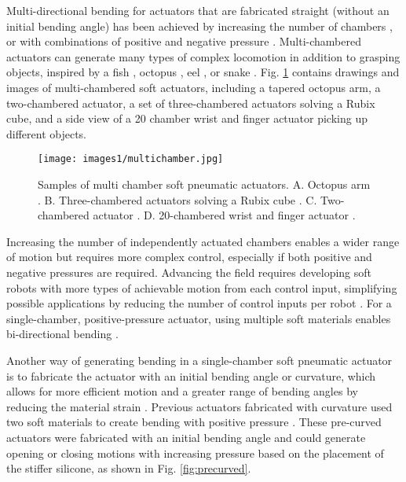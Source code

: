 Multi-directional bending for actuators that are fabricated straight (without an initial bending angle) has been achieved by increasing the number of chambers \cite{bilodeau_design_2018, cappello_exploiting_2018, fei_novel_2019, pang_novel_2019, pagoli_soft_2021}, or with combinations of positive and negative pressure \cite{wakimoto_miniature_2011, ariyanto_three-fingered_2019, fatahillah_novel_2020, terrile_comparison_2021}. Multi-chambered actuators can generate many types of complex locomotion in addition to grasping objects, inspired by a fish \cite{feng_body_2020, zhou_modeling_2020}, octopus \cite{fras_bio-inspired_2018, xie_octopus_2020}, eel \cite{nguyen_anguilliform_2022}, or snake \cite{arachchige_wheelless_2023}. Fig. \ref{fig:multichamber} contains drawings and images of multi-chambered soft actuators, including a tapered octopus arm, a two-chambered actuator, a set of three-chambered actuators solving a Rubix cube, and a side view of a 20 chamber wrist and finger actuator picking up different objects. \\

\begin{figure}[!ht]
    \centering
    \texttt{[image: images1/multichamber.jpg]}
    \caption{Samples of multi chamber soft pneumatic actuators. A. Octopus arm \cite{xie_octopus_2020}. B. Three-chambered actuators solving a Rubix cube \cite{pagoli_soft_2021}. C. Two-chambered actuator \cite{bilodeau_design_2018}. D. 20-chambered wrist and finger actuator \cite{fei_novel_2019}.}
    \label{fig:multichamber}
\end{figure}

Increasing the number of independently actuated chambers enables a wider range of motion but requires more complex control, especially if both positive and negative pressures are required. Advancing the field requires developing soft robots with more types of achievable motion from each control input, simplifying possible applications by reducing the number of control inputs per robot \cite{gorissen_elastic_2017}. For a single-chamber, positive-pressure actuator, using multiple soft materials enables bi-directional bending \cite{ellis_generative_2022}. 

\clearpage
Another way of generating bending in a single-chamber soft pneumatic actuator is to fabricate the actuator with an initial bending angle or curvature, which allows for more efficient motion and a greater range of bending angles by reducing the material strain \cite{perez-guagnelli_deflected_2022}. Previous actuators fabricated with curvature used two soft materials to create bending with positive pressure \cite{hu_precurved_2022}. These pre-curved actuators were fabricated with an initial bending angle and could generate opening or closing motions with increasing pressure based on the placement of the stiffer silicone, as shown in Fig. \ref{fig:precurved}. \\


